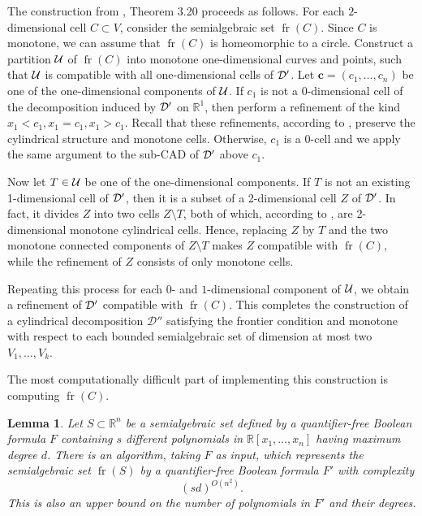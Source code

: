\documentclass[
]{book}
\newtheorem{lemma}{Lemma}[chapter]
\theoremstyle{definition}
\theoremstyle{definition}
\theoremstyle{definition}
\theoremstyle{definition}
\theoremstyle{remark}
\begin{document}
The construction from \citet{bgv15}, Theorem 3.20 proceeds as follows. For each \(2\)-dimensional cell \(C \subset V\), consider the semialgebraic set \({\operatorname{fr} \left( C \right)}\). Since \(C\) is monotone, we can assume that \({\operatorname{fr} \left( C \right)}\) is homeomorphic to a circle. Construct a partition \(\cal U\) of \({\operatorname{fr} \left( C \right)}\) into monotone one-dimensional curves and points, such that \(\cal U\) is compatible with all one-dimensional cells of \(\cal D'\).
Let \(\mathbf{c} = (c_1,\ldots,c_n)\) be one of the one-dimensional components of \(\cal U\). If \(c_1\) is not a \(0\)-dimensional cell of the decomposition induced by \(\cal D'\) on \(\mathbb{R}^1\), then perform a refinement of the kind \(x_1 < c_1, x_1 = c_1, x_1 > c_1\). Recall that these refinements, according to \citep[Lemma 3.11]{bgv15}, preserve the cylindrical structure and monotone cells. Otherwise, \(c_1\) is a \(0\)-cell and we apply the same argument to the sub-CAD of \(\cal D'\) above \(c_1\).

Now let \(T \in {\cal U}\) be one of the one-dimensional components. If \(T\) is not an existing 1-dimensional cell of \(\cal D'\), then it is a subset of a 2-dimensional cell \(Z\) of \(\cal D'\). In fact, it divides \(Z\) into two cells \(Z \setminus T\), both of which, according to \citep[Theorem 11]{bgv13}, are 2-dimensional monotone cylindrical cells. Hence, replacing \(Z\) by \(T\) and the two monotone connected components of \(Z \setminus T\) makes \(Z\) compatible with \({\operatorname{fr} \left( C \right)}\), while the refinement of \(Z\) consists of only monotone cells.

Repeating this process for each \(0\)- and \(1\)-dimensional component of \(\cal U\), we obtain a refinement of \(\cal D'\) compatible with \({\operatorname{fr} \left( C \right)}\).
This completes the construction of a cylindrical decomposition \(\mathcal{D''}\) satisfying the frontier condition and monotone with respect to each bounded semialgebraic set of dimension at most two \(V_1,\ldots,V_k\).

The most computationally difficult part of implementing this construction is computing \({\operatorname{fr} \left( C \right)}\).

\begin{lemma}
\protect\hypertarget{lem:frontier}{}\label{lem:frontier}Let \(S \subset \mathbb{R}^n\) be a semialgebraic set defined by a quantifier-free Boolean formula \(F\)
containing \(s\) different polynomials in \(\mathbb{R}[x_1, \ldots ,x_n]\) having maximum degree \(d\).
There is an algorithm, taking \(F\) as input, which represents the semialgebraic set \({\operatorname{fr} \left(  S  \right)}\) by a quantifier-free Boolean formula \(F'\) with complexity
\[(sd)^{O(n^2)}.
\]
This is also an upper bound on the number of polynomials in \(F'\) and their degrees.
\end{lemma}
\end{document}
